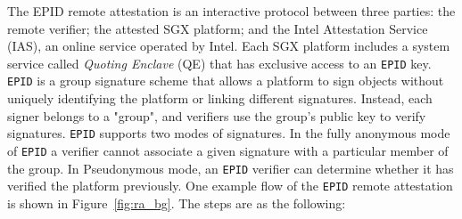 
The EPID remote attestation is an interactive protocol between three parties: the remote verifier; the attested SGX platform; and the Intel Attestation Service (IAS), an online service operated by Intel. Each SGX platform includes a system service called \emph{Quoting Enclave} (QE) that has exclusive access to an \texttt{EPID} key. \texttt{EPID} is a group signature scheme that allows a platform to sign objects without uniquely identifying the platform or linking different signatures. Instead, each signer belongs to a "group", and verifiers use the group's public key to verify signatures. \texttt{EPID} supports two modes of signatures. In the fully anonymous mode of \texttt{EPID} a verifier cannot associate a given signature with a particular member of the group. In Pseudonymous mode, an \texttt{EPID} verifier can determine whether it has verified the platform previously.
One example flow of the \texttt{EPID} remote attestation is shown in Figure~\ref{fig:ra_bg}. The steps are as the following:


